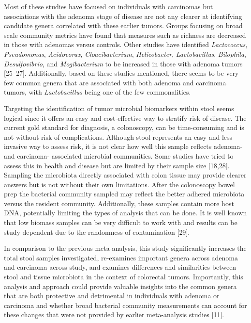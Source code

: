 \documentclass[12pt,]{article}
\begin{document}
Most of these studies have focused on individuals with carcinomas but
associations with the adenoma stage of disease are not any clearer at
identifying candidate genera correlated with these earlier tumors.
Groups focusing on broad scale community metrics have found that
measures such as richness are decreased in those with adenomas versus
controls. Other studies have identified \emph{Lactococcus},
\emph{Pseudomonas}, \emph{Acidovorax}, \emph{Cloacibacterium},
\emph{Helicobacter}, \emph{Lactobacillus}, \emph{Bilophila},
\emph{Desulfovibrio}, and \emph{Mogibacterium} to be increased in those
with adenoma tumors {[}25--27{]}. Additionally, based on these studies
mentioned, there seems to be very few common genera that are associated
with both adenoma and carcinoma tumors, with \emph{Lactobacillus} being
one of the few commonalities.

Targeting the identification of tumor microbial biomarkers within stool
seems logical since it offers an easy and cost-effective way to stratify
risk of disease. The current gold standard for diagnosis, a colonoscopy,
can be time-consuming and is not without risk of complications. Although
stool represents an easy and less invasive way to assess risk, it is not
clear how well this sample reflects adenoma- and carcinoma- associated
microbial communities. Some studies have tried to assess this in health
and disease but are limited by their sample size {[}18,28{]}. Sampling
the microbiota directly associated with colon tissue may provide clearer
answers but is not without their own limitations. After the colonoscopy
bowel prep the bacterial community sampled may reflect the better
adhered microbiota versus the resident community. Additionally, these
samples contain more host DNA, potentially limiting the types of
analysis that can be done. It is well known that low biomass samples can
be very difficult to work with and results can be study dependent due to
the randomness of contamination {[}29{]}.

In comparison to the previous meta-analysis, this study significantly
increases the total stool samples investigated, re-examines important
genera across adenoma and carcinoma across study, and examines
differences and similarities between stool and tissue microbiota in the
context of colorectal tumors. Importantly, this analysis and approach
could provide valuable insights into the common genera that are both
protective and detrimental in individuals with adenoma or carcinoma and
whether broad bacterial community measurements can account for these
changes that were not provided by earlier meta-analysis studies
{[}11{]}.
\end{document}
